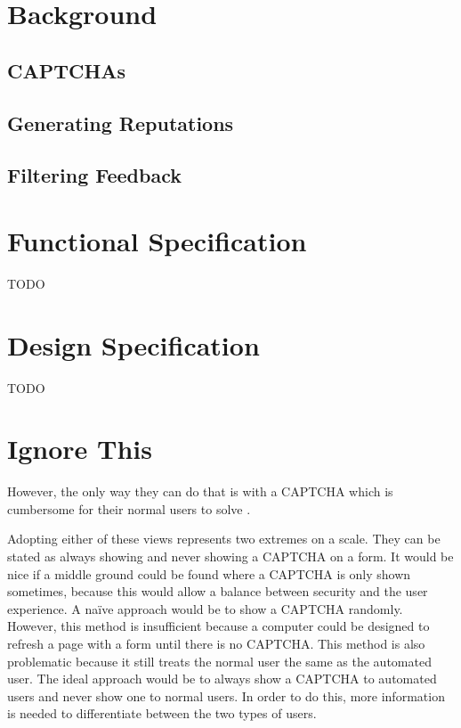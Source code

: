 \documentclass[journal, 12pt, onecolumn, draftclsnofoot]{IEEEtran}
\begin{document}
\section{Background}
\label{Background}

\subsection{CAPTCHAs}

\subsection{Generating Reputations}

\subsection{Filtering Feedback}

\section{Functional Specification}
\label{Functional Specification}
TODO

\section{Design Specification}
\label{Design Specification}
TODO

\section{Ignore This}


However, the only way they can do that is with a CAPTCHA which is cumbersome for their normal users to solve \cite{kluever, yan, benasher}.

Adopting either of these views represents two extremes on a scale. They can be stated as always showing and never showing a CAPTCHA on a form. It would be nice if a middle ground could be found where a CAPTCHA is only shown sometimes, because this would allow a balance between security and the user experience. A naïve approach would be to show a CAPTCHA randomly. However, this method is insufficient because a computer could be designed to refresh a page with a form until there is no CAPTCHA. This method is also problematic because it still treats the normal user the same as the automated user. The ideal approach would be to always show a CAPTCHA to automated users and never show one to normal users. In order to do this, more information is needed to differentiate between the two types of users.
\end{document}
